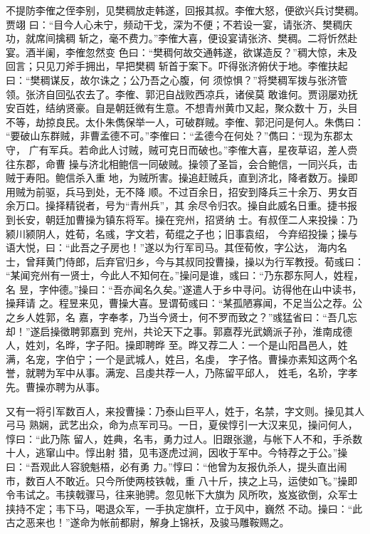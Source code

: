 不提防李傕之侄李别，见樊稠放走韩遂，回报其叔。李傕大怒，便欲兴兵讨樊稠。贾翊
曰：“目今人心未宁，频动干戈，深为不便；不若设一宴，请张济、樊稠庆功，就席间擒稠
斩之，毫不费力。”李傕大喜，便设宴请张济、樊稠。二将忻然赴宴。酒半阑，李傕忽然变
色曰：“樊稠何故交通韩遂，欲谋造反？”稠大惊，未及回言；只见刀斧手拥出，早把樊稠
斩首于案下。吓得张济俯伏于地。李傕扶起曰：“樊稠谋反，故尔诛之；公乃吾之心腹，何
须惊惧？”将樊稠军拨与张济管领。张济自回弘农去了。李傕、郭汜自战败西凉兵，诸侯莫
敢谁何。贾诩屡劝抚安百姓，结纳贤豪。自是朝廷微有生意。不想青州黄巾又起，聚众数十
万，头目不等，劫掠良民。太仆朱儁保举一人，可破群贼。李傕、郭汜问是何人。朱儁曰：
“要破山东群贼，非曹孟德不可。”李傕曰：“孟德今在何处？”儁曰：“现为东郡太守，
广有军兵。若命此人讨贼，贼可克日而破也。”李傕大喜，星夜草诏，差人赍往东郡，命曹
操与济北相鲍信一同破贼。操领了圣旨，会合鲍信，一同兴兵，击贼于寿阳。鲍信杀入重
地，为贼所害。操追赶贼兵，直到济北，降者数万。操即用贼为前驱，兵马到处，无不降
顺。不过百余日，招安到降兵三十余万、男女百余万口。操择精锐者，号为“青州兵”，其
余尽令归农。操自此威名日重。捷书报到长安，朝廷加曹操为镇东将军。操在兖州，招贤纳
士。有叔侄二人来投操：乃颍川颍阴人，姓荀，名彧，字文若，荀绲之子也；旧事袁绍，
今弃绍投操；操与语大悦，曰：“此吾之子房也！”遂以为行军司马。其侄荀攸，字公达，
海内名士，曾拜黄门侍郎，后弃官归乡，今与其叔同投曹操，操以为行军教授。荀彧曰：
“某闻兖州有一贤士，今此人不知何在。”操问是谁，彧曰：“乃东郡东阿人，姓程，名
昱，字仲德。”操曰：“吾亦闻名久矣。”遂遣人于乡中寻问。访得他在山中读书，操拜请
之。程昱来见，曹操大喜。昱谓荀彧曰：“某孤陋寡闻，不足当公之荐。公之乡人姓郭，名
嘉，字奉孝，乃当今贤士，何不罗而致之？”彧猛省曰：“吾几忘却！”遂启操徵聘郭嘉到
兖州，共论天下之事。郭嘉荐光武嫡派子孙，淮南成德人，姓刘，名晔，字子阳。操即聘晔
至。晔又荐二人：一个是山阳昌邑人，姓满，名宠，字伯宁；一个是武城人，姓吕，名虔，
字子恪。曹操亦素知这两个名誉，就聘为军中从事。满宠、吕虔共荐一人，乃陈留平邱人，
姓毛，名玠，字孝先。曹操亦聘为从事。

又有一将引军数百人，来投曹操：乃泰山巨平人，姓于，名禁，字文则。操见其人弓马
熟娴，武艺出众，命为点军司马。一日，夏侯惇引一大汉来见，操问何人，惇曰：“此乃陈
留人，姓典，名韦，勇力过人。旧跟张邈，与帐下人不和，手杀数十人，逃窜山中。惇出射
猎，见韦逐虎过涧，因收于军中。今特荐之于公。”操曰：“吾观此人容貌魁梧，必有勇
力。”惇曰：“他曾为友报仇杀人，提头直出闹市，数百人不敢近。只今所使两枝铁戟，重
八十斤，挟之上马，运使如飞。”操即令韦试之。韦挟戟骤马，往来驰骋。忽见帐下大旗为
风所吹，岌岌欲倒，众军士挟持不定；韦下马，喝退众军，一手执定旗杆，立于风中，巍然
不动。操曰：“此古之恶来也！”遂命为帐前都尉，解身上锦袄，及骏马雕鞍赐之。

